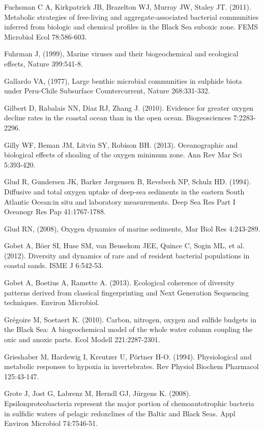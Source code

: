 Fuchsman C A, Kirkpatrick JB, Brazelton WJ, Murray JW, Staley JT. (2011). Metabolic strategies of free-living and aggregate-associated bacterial communities inferred from biologic and chemical profiles in the Black Sea suboxic zone. FEMS Microbiol Ecol 78:586-603.

Fuhrman J, (1999), Marine viruses and their biogeochemical and ecological effects, Nature 399:541-8.

Gallardo VA, (1977), Large benthic microbial communities in sulphide biota under Peru-Chile Subsurface Countercurrent, Nature 268:331-332.

Gilbert D, Rabalais NN, Díaz RJ, Zhang J. (2010). Evidence for greater oxygen decline rates in the coastal ocean than in the open ocean. Biogeosciences 7:2283-2296.

Gilly WF, Beman JM, Litvin SY, Robison BH. (2013). Oceanographic and biological effects of shoaling of the oxygen minimum zone. Ann Rev Mar Sci 5:393-420.

Glud R, Gundersen JK, Barker J{\o}rgensen B, Revsbech NP, Schulz HD. (1994). Diffusive and total oxygen uptake of deep-sea sediments in the eastern South Atlantic Ocean:in situ and laboratory measurements. Deep Sea Res Part I Oceanogr Res Pap 41:1767-1788.

Glud RN, (2008), Oxygen dynamics of marine sediments, Mar Biol Res 4:243-289.

Gobet A, B\" oer SI, Huse SM, van Beusekom JEE, Quince C, Sogin ML, et al. (2012). Diversity and dynamics of rare and of resident bacterial populations in coastal sands. ISME J 6:542-53.

Gobet A, Boetius A, Ramette A. (2013). Ecological coherence of diversity patterns derived from classical fingerprinting and Next Generation Sequencing techniques. Environ Microbiol. 

Grégoire M, Soetaert K. (2010). Carbon, nitrogen, oxygen and sulfide budgets in the Black Sea: A biogeochemical model of the whole water column coupling the oxic and anoxic parts. Ecol Modell 221:2287-2301.

Grieshaber M, Hardewig I, Kreutzer U, P\"ortner H-O. (1994). Physiological and metabolic responses to hypoxia in invertebrates. Rev Physiol Biochem Pharmacol 125:43-147.

Grote J, Jost G, Labrenz M, Herndl GJ, J\"urgens K. (2008). Epsilonproteobacteria represent the major portion of chemoautotrophic bacteria in sulfidic waters of pelagic redoxclines of the Baltic and Black Seas. Appl Environ Microbiol 74:7546-51.

